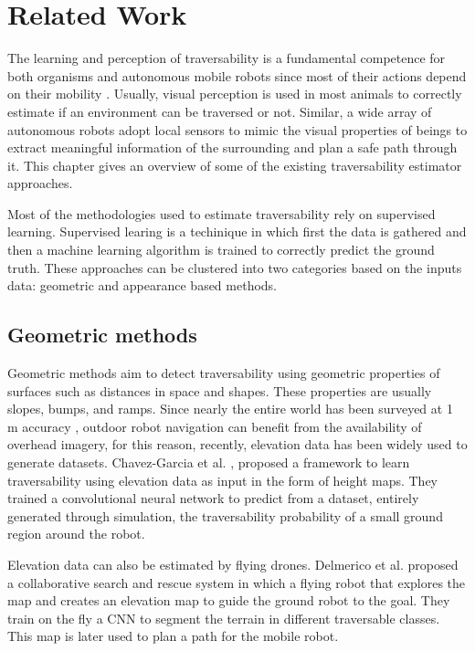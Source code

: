 \documentclass[../document.tex]{subfiles}
\begin{document}
\chapter{Related Work}
\label{chap: related-work}
The learning and perception of traversability is
a fundamental competence for both organisms and autonomous mobile robots since most of their
actions depend on their mobility \cite{ugur2010traversability}. 
Usually, visual perception is used in most animals to correctly estimate if an environment can be traversed or not.
Similar, a wide array of autonomous robots adopt local sensors to mimic the visual properties of beings to extract meaningful information of the surrounding and plan a safe path through it. This chapter gives an overview of some of the existing traversability estimator approaches.

Most of the methodologies used to estimate traversability rely on supervised learning. Supervised learing is a techinique in which first the data is gathered and then a machine learning algorithm is trained to correctly predict the ground truth. These approaches can be clustered into two categories based on the inputs data: geometric and appearance based methods. 
\section{Geometric methods}
Geometric methods aim to detect traversability using geometric properties of surfaces such as distances in space and shapes. These properties are usually slopes, bumps, and ramps. Since nearly the entire world has been surveyed at 1 m accuracy \cite{sofman2006improving}, 
outdoor robot navigation can benefit from the availability of overhead imagery, for this reason, recently, elevation data has been widely used to generate datasets. Chavez-Garcia et al. \cite{omar2018traversability}, proposed a framework to learn traversability using elevation data as input in the form of height maps. They trained a convolutional neural network to predict from a dataset, entirely generated through simulation, the traversability probability of a small ground region around the robot.

Elevation data can also be estimated by flying drones. Delmerico et al. \cite{delmerico2016active} proposed a collaborative search and rescue system in which a flying robot that explores the map and creates an elevation map to guide the ground robot to the goal. They train on the fly a CNN to segment the terrain in different traversable classes. This map is later used to plan a path for the mobile robot.
\end{document}
